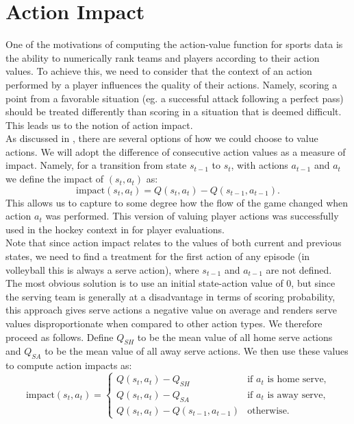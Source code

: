 \documentclass{sfuthesis}
\begin{document}
	\section{Action Impact}
	
	One of the motivations of computing the action-value function for sports data is the ability to numerically rank teams and players according to their action values. To achieve this, we need to consider that the context of an action performed by a player influences the quality of their actions. Namely, scoring a point from a favorable situation (eg. a successful attack following a perfect pass) should be treated differently than scoring in a situation that is deemed difficult. This leads us to the notion of action impact.\\
	As discussed in \cite{routley2015markov}, there are several options of how we could choose to value actions. We will adopt the difference of consecutive action values as a measure of impact. Namely, for a transition from state $s_{t-1}$ to $s_t$, with actions $a_{t-1}$ and $a_t$ we define the impact of $(s_t, a_t)$ as:
	\begin{equation}
		\text{impact}(s_t,a_t) = Q(s_t,a_t) - Q(s_{t-1},a_{t-1}).
		\label{eq:action_impact}
	\end{equation}
	This allows us to capture to some degree how the flow of the game changed when action $a_t$ was performed. This version of valuing player actions was successfully used in the hockey context in \cite{liu2018deep} for player evaluations.\\
	Note that since action impact relates to the values of both current and previous states, we need to find a treatment for the first action of any episode (in volleyball this is always a serve action), where $s_{t-1}$ and $a_{t-1}$ are not defined. The most obvious solution is to use an initial state-action value of 0, but since the serving team is generally at a disadvantage in terms of scoring probability, this approach gives serve actions a negative value on average and renders serve values disproportionate when compared to other action types. We therefore proceed as follows. Define $Q_{SH}$ to be the mean value of all home serve actions and $Q_{SA}$ to be the mean value of all away serve actions. We then use these values to compute action impacts as:
	\begin{equation}
		\text{impact}(s_t,a_t) =
		\begin{cases} 
			Q(s_t,a_t) - Q_{SH} & \text{if } a_t \text{ is home serve,} \\
			Q(s_t,a_t) - Q_{SA} & \text{if } a_t \text{ is away serve,} \\
			Q(s_t,a_t) - Q(s_{t-1},a_{t-1}) & \text{otherwise.} 
		\end{cases}
		\label{eq:action_impact2}
	\end{equation}
\end{document}
